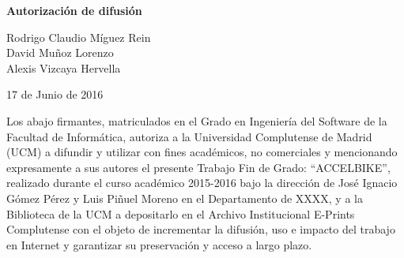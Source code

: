 
\newpage

\thispagestyle{empty}

\begin{center}

{\bf \Huge Autorización de difusión}

\vspace{1cm}


   \large Rodrigo Claudio Míguez Rein\\
   \large David Muñoz Lorenzo\\
   \large Alexis Vizcaya Hervella\\

   \vspace{0.5cm}


   17 de Junio de 2016\\

   \vspace{0.5cm}
   \end{center}
   
Los abajo firmantes, matriculados en el Grado en Ingeniería del Software de la Facultad de Informática, autoriza a la Universidad Complutense de Madrid (UCM) a difundir y utilizar con fines académicos, no comerciales y mencionando expresamente a sus autores el presente Trabajo Fin de Grado: “ACCELBIKE”, realizado durante el curso académico 2015-2016 bajo la dirección de José Ignacio Gómez Pérez y Luis Piñuel Moreno en el Departamento de XXXX, y a la Biblioteca de la UCM a depositarlo en el Archivo Institucional E-Prints Complutense con el objeto de incrementar la difusión, uso e impacto del trabajo en Internet y garantizar su preservación y acceso a largo plazo.

